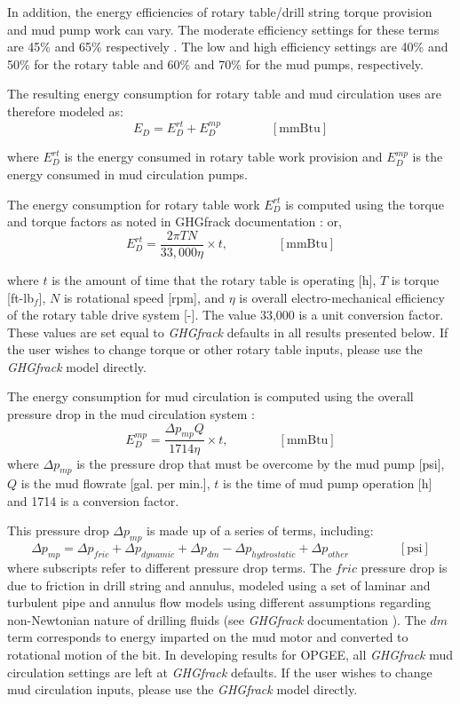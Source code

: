\documentclass[11pt]{report}
\newcommand{\eqnunit}[1]{\quad\quad \scriptstyle{\left[\text{#1}\right]}}
\begin{document}
In addition, the energy efficiencies of rotary table/drill string torque provision and mud pump work can vary. The moderate efficiency settings for these terms are 45\% and 65\% respectively \cite{Vafi2016b}.  The low and high efficiency settings are 40\% and 50\% for the rotary table and 60\% and 70\% for the mud pumps, respectively.

The resulting energy consumption for rotary table and mud circulation uses are therefore modeled as:
\begin{equation}
E_{D} = E_{D}^{rt} + E_{D}^{mp} \quad\quad\eqnunit{mmBtu}
\end{equation}

where $E_{D}^{rt}$ is the energy consumed in rotary table work provision and $E_{D}^{mp}$ is the energy consumed in mud circulation pumps.

The energy consumption for rotary table work $E_{D}^{rt}$ is computed using the torque and torque factors as noted in GHGfrack documentation \cite{Vafi2016b}:
or,
\begin{equation}
E_{D}^{rt} = \frac{2 \pi T N}{33,000 \eta} \times t, \quad\quad\eqnunit{mmBtu}
\end{equation}

where $t$ is the amount of time that the rotary table is operating [h], $T$ is torque [ft-lb$_f$], $N$ is rotational speed [rpm], and $\eta$ is overall electro-mechanical efficiency of the rotary table drive system [-]. The value 33,000 is a unit conversion factor.  These values are set equal to \emph{GHGfrack} defaults in all results presented below. If the user wishes to change torque or other rotary table inputs, please use the \emph{GHGfrack} model directly. 

The energy consumption for mud circulation is computed using the overall pressure drop in the mud circulation system \cite{Vafi2016b}:
\begin{equation}
E_{D}^{mp} = \frac{\Delta p_{mp} Q}{1714 \eta} \times t, \quad\quad\eqnunit{mmBtu}
\end{equation}
where $\Delta p_{mp}$ is the pressure drop that must be overcome by the mud pump [psi], $Q$ is the mud flowrate [gal. per min.], $t$ is the time of mud pump operation [h] and 1714 is a conversion factor.

This pressure drop $\Delta p_{mp}$ is made up of a series of terms, including:
\begin{equation}
\Delta p_{mp} = \Delta p_{fric} + \Delta p_{dynamic} + \Delta p_{dm} - \Delta p_{hydrostatic} + \Delta p_{other} \quad\quad\eqnunit{psi}
\end{equation}
where subscripts refer to different pressure drop terms.  The $fric$ pressure drop is due to friction in drill string and annulus, modeled using a set of laminar and turbulent pipe and annulus flow models using different assumptions regarding non-Newtonian nature of drilling fluids (see \emph{GHGfrack} documentation \cite{Vafi2016a, Vafi2016b}).  The $dm$ term corresponds to energy imparted on the mud motor and converted to rotational motion of the bit.  In developing results for OPGEE, all \emph{GHGfrack} mud circulation settings are left at \emph{GHGfrack} defaults. If the user wishes to change mud circulation inputs, please use the \emph{GHGfrack} model directly. 
\end{document}
